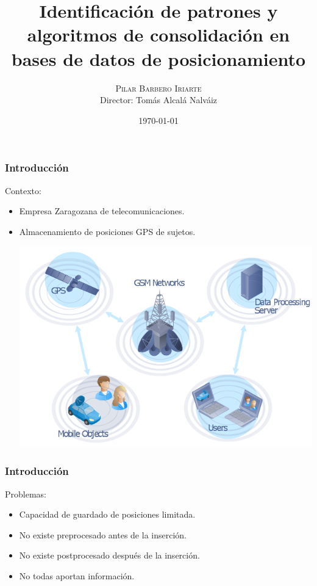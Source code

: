 \documentclass[10pt, spanish]{beamer}
\title{Identificaci\'on de patrones y algoritmos de consolidaci\'on en bases de datos de posicionamiento}
\date{\today}
\author{\textsc{\Large{Pilar Barbero Iriarte}}\\
Director: Tom\'as Alcal\'a Nalv\'aiz}
\institute{Universidad de Zaragoza}
\begin{document}
\maketitle



\begin{frame}[fragile]
\frametitle{Introducci\'on}
Contexto: 
\begin{itemize}
	\item Empresa Zaragozana de telecomunicaciones.
	\item Almacenamiento de posiciones GPS de sujetos.
	
	\begin{center}
		\includegraphics[scale=.45]{first.png}
	\end{center}
\end{itemize}
\end{frame}


\begin{frame}[fragile]
\frametitle{Introducci\'on}
Problemas:
	\begin{itemize}
		\item Capacidad de guardado de posiciones limitada.
		\item No existe preprocesado antes de la inserci\'on.
		\item No existe postprocesado despu\'es de la inserci\'on.
		\item No todas aportan informaci\'on.
	\end{itemize}
\end{frame}
\end{document}
